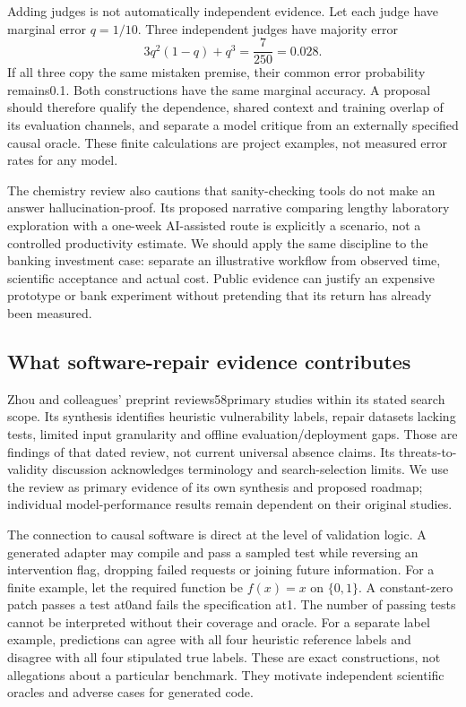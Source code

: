 Adding judges is not automatically independent evidence. Let each judge have marginal error $q=1/10$. Three independent judges have majority error
\[
 3q^2(1-q)+q^3=\frac{7}{250}=0.028.
\]
If all three copy the same mistaken premise, their common error probability remains0.1. Both constructions have the same marginal accuracy. A proposal should therefore qualify the dependence, shared context and training overlap of its evaluation channels, and separate a model critique from an externally specified causal oracle. These finite calculations are project examples, not measured error rates for any model.\citep{exec25_cow_reference}

The chemistry review also cautions that sanity-checking tools do not make an answer hallucination-proof. Its proposed narrative comparing lengthy laboratory exploration with a one-week AI-assisted route is explicitly a scenario, not a controlled productivity estimate. We should apply the same discipline to the banking investment case: separate an illustrative workflow from observed time, scientific acceptance and actual cost. Public evidence can justify an expensive prototype or bank experiment without pretending that its return has already been measured.\citep{exec25_cow_chemistry,exec25_cow_reference}

\subsection{What software-repair evidence contributes}

Zhou and colleagues' preprint reviews58primary studies within its stated search scope. Its synthesis identifies heuristic vulnerability labels, repair datasets lacking tests, limited input granularity and offline evaluation/deployment gaps. Those are findings of that dated review, not current universal absence claims. Its threats-to-validity discussion acknowledges terminology and search-selection limits. We use the review as primary evidence of its own synthesis and proposed roadmap; individual model-performance results remain dependent on their original studies.\citep{exec25_cow_vulnerability}

The connection to causal software is direct at the level of validation logic. A generated adapter may compile and pass a sampled test while reversing an intervention flag, dropping failed requests or joining future information. For a finite example, let the required function be $f(x)=x$ on $\{0,1\}$. A constant-zero patch passes a test at0and fails the specification at1. The number of passing tests cannot be interpreted without their coverage and oracle. For a separate label example, predictions can agree with all four heuristic reference labels and disagree with all four stipulated true labels. These are exact constructions, not allegations about a particular benchmark. They motivate independent scientific oracles and adverse cases for generated code.\citep{exec25_cow_reference}

